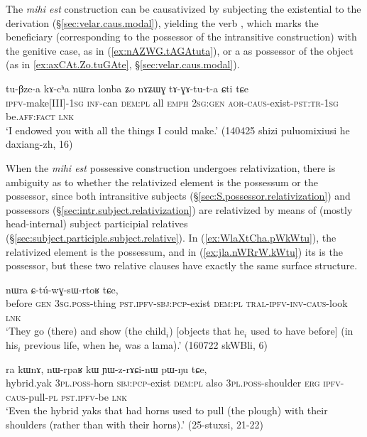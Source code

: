  The  \textit{mihi est} construction can be causativized by subjecting the existential  to the  derivation (§\ref{sec:velar.caus.modal}), yielding the verb , which marks the beneficiary (corresponding to the possessor of the intransitive construction) with the genitive case, as  in (\ref{ex:nAZWG.tAGAtuta}), or a as possessor of the object (as in \ref{ex:axCAt.Zo.tuGAte}, §\ref{sec:velar.caus.modal}).
 
 \begin{exe}
\ex \label{ex:nAZWG.tAGAtuta}
\gll tu-βze-a kɤ-cʰa nɯra lonba ʑo nɤʑɯɣ tɤ-ɣɤ-tu-t-a ɕti tɕe \\
\textsc{ipfv}-make[III]-\textsc{1sg} \textsc{inf}-can \textsc{dem}:\textsc{pl} all \textsc{emph} \textsc{2sg}:\textsc{gen} \textsc{aor}-\textsc{caus}-exist-\textsc{pst}:\textsc{tr}-\textsc{1sg} be.\textsc{aff}:\textsc{fact} \textsc{lnk} \\
\glt  `I endowed you with all the things I could make.' (140425 shizi puluomixiusi he daxiang-zh, 16)
 \end{exe}
 
 
When the \textit{mihi est} possessive construction undergoes relativization, there is ambiguity as to whether the relativized element is the possessum or the possessor, since both intransitive subjects (§\ref{sec:S.possessor.relativization}) and possessors (§\ref{sec:intr.subject.relativization}) are relativized by means of (mostly head-internal) subject participial relatives (§\ref{sec:subject.participle.subject.relative}). In (\ref{ex:WlaXtCha.pWkWtu}), the relativized element is the possessum, and in (\ref{ex:jla.nWRrW.kWtu}) its is the possessor, but these two relative clauses have exactly the same surface structure.
 
 \begin{exe}
\ex \label{ex:WlaXtCha.pWkWtu}
 nɯra ɕ-tú-wɣ-sɯ-rtoʁ tɕe, \\
before \textsc{gen} \textsc{3sg}.\textsc{poss}-thing \textsc{pst}.\textsc{ipfv}-\textsc{sbj}:\textsc{pcp}-exist \textsc{dem}:\textsc{pl} \textsc{tral}-\textsc{ipfv}-\textsc{inv}-\textsc{caus}-look \textsc{lnk} \\
\glt `They go (there) and show (the child$_i$) [objects that he$_i$ used to have before] (in his$_i$ previous life, when he$_i$ was a lama).' (160722 skWBli, 6)
 \end{exe}
 
\begin{exe}
\ex \label{ex:jla.nWRrW.kWtu}
 ra kɯnɤ, nɯ-rpaʁ kɯ ɲɯ-z-rɤɕi-nɯ pɯ-ŋu tɕe, \\
hybrid.yak \textsc{3pl}.\textsc{poss}-horn \textsc{sbj}:\textsc{pcp}-exist \textsc{dem}:\textsc{pl} also \textsc{3pl}.\textsc{poss}-shoulder \textsc{erg} \textsc{ipfv}-\textsc{caus}-pull-\textsc{pl} \textsc{pst}.\textsc{ipfv}-be \textsc{lnk} \\
\glt `Even the hybrid yaks that had horns used to pull (the plough) with their shoulders (rather than with their horns).' (25-stuxsi, 21-22)
  \end{exe}


